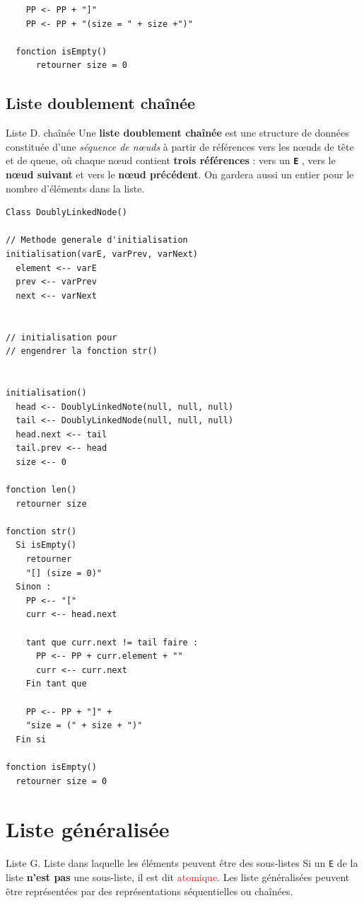 \documentclass{report}
\begin{document}
\begin{multicols*}{3}
\begin{lstlisting}
    PP <- PP + "]" 
    PP <- PP + "(size = " + size +")"

  fonction isEmpty() 
      retourner size = 0
  \end{lstlisting}

  \section{Liste doublement chaînée}
  \begin{Definitionx}{Liste D. chaînée}{}
    Une \textbf{liste doublement chaînée} est une structure de 
    données constituée d'une \textit{séquence de nœuds} à partir 
    de références vers les nœuds de tête et de queue, 
    où chaque nœud contient \textbf{trois références} : 
    vers un \texttt{\textbf{E}}  , 
    vers le \textbf{nœud suivant} et vers le \textbf{nœud précédent}.
    On gardera aussi un entier pour le nombre d’éléments 
    dans la liste.     
  \end{Definitionx}

  \begin{lstlisting}
Class DoublyLinkedNode() 

// Methode generale d'initialisation
initialisation(varE, varPrev, varNext) 
  element <-- varE 
  prev <-- varPrev 
  next <-- varNext 


// initialisation pour 
// engendrer la fonction str()


initialisation()
  head <-- DoublyLinkedNote(null, null, null)
  tail <-- DoublyLinkedNode(null, null, null) 
  head.next <-- tail
  tail.prev <-- head 
  size <-- 0 

fonction len() 
  retourner size 

fonction str() 
  Si isEmpty() 
    retourner 
    "[] (size = 0)"
  Sinon :
    PP <-- "[" 
    curr <-- head.next

    tant que curr.next != tail faire :
      PP <-- PP + curr.element + "" 
      curr <-- curr.next 
    Fin tant que 

    PP <-- PP + "]" + 
    "size = (" + size + ")"
  Fin si 

fonction isEmpty() 
  retourner size = 0

  \end{lstlisting}

  \chapter{Liste généralisée}
  \begin{Definitionx}{Liste G.}{}
      Liste dans laquelle les éléments 
      peuvent être des sous-listes 
      Si un \texttt{E} de la liste 
      \textbf{n'est pas} une sous-liste, il est dit 
      \textcolor{red}{atomique}. Les liste 
      généralisées peuvent être représentées 
      par des représentations 
      séquentielles ou chaînées. 
  \end{Definitionx}


\end{multicols*}
\end{document}
